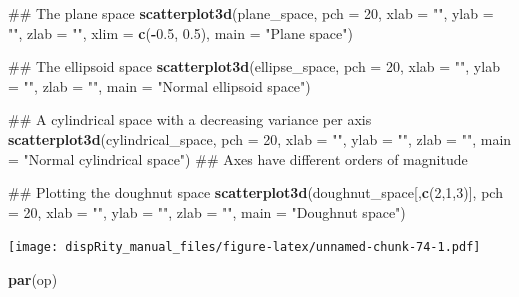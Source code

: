 \documentclass[]{book}
\newenvironment{Shaded}{\begin{snugshade}}{\end{snugshade}}
\newcommand{\KeywordTok}[1]{\textcolor[rgb]{0.13,0.29,0.53}{\textbf{#1}}}
\newcommand{\DataTypeTok}[1]{\textcolor[rgb]{0.13,0.29,0.53}{#1}}
\newcommand{\DecValTok}[1]{\textcolor[rgb]{0.00,0.00,0.81}{#1}}
\newcommand{\FloatTok}[1]{\textcolor[rgb]{0.00,0.00,0.81}{#1}}
\newcommand{\StringTok}[1]{\textcolor[rgb]{0.31,0.60,0.02}{#1}}
\newcommand{\OperatorTok}[1]{\textcolor[rgb]{0.81,0.36,0.00}{\textbf{#1}}}
\newcommand{\NormalTok}[1]{#1}
\theoremstyle{definition}
\theoremstyle{definition}
\theoremstyle{remark}
\begin{document}
\begin{Shaded}
\begin{Highlighting}[]
\NormalTok{## The plane space}
\KeywordTok{scatterplot3d}\NormalTok{(plane_space, }\DataTypeTok{pch =} \DecValTok{20}\NormalTok{, }\DataTypeTok{xlab =} \StringTok{""}\NormalTok{, }\DataTypeTok{ylab =} \StringTok{""}\NormalTok{, }\DataTypeTok{zlab =} \StringTok{""}\NormalTok{,}
              \DataTypeTok{xlim =} \KeywordTok{c}\NormalTok{(}\OperatorTok{-}\FloatTok{0.5}\NormalTok{, }\FloatTok{0.5}\NormalTok{), }\DataTypeTok{main =} \StringTok{"Plane space"}\NormalTok{)}

\NormalTok{## The ellipsoid space}
\KeywordTok{scatterplot3d}\NormalTok{(ellipse_space, }\DataTypeTok{pch =} \DecValTok{20}\NormalTok{, }\DataTypeTok{xlab =} \StringTok{""}\NormalTok{, }\DataTypeTok{ylab =} \StringTok{""}\NormalTok{, }\DataTypeTok{zlab =} \StringTok{""}\NormalTok{,}
              \DataTypeTok{main =} \StringTok{"Normal ellipsoid space"}\NormalTok{)}

\NormalTok{## A cylindrical space with a decreasing variance per axis}
\KeywordTok{scatterplot3d}\NormalTok{(cylindrical_space, }\DataTypeTok{pch =} \DecValTok{20}\NormalTok{, }\DataTypeTok{xlab =} \StringTok{""}\NormalTok{, }\DataTypeTok{ylab =} \StringTok{""}\NormalTok{, }\DataTypeTok{zlab =} \StringTok{""}\NormalTok{,}
              \DataTypeTok{main =} \StringTok{"Normal cylindrical space"}\NormalTok{)}
\NormalTok{## Axes have different orders of magnitude}

\NormalTok{## Plotting the doughnut space}
\KeywordTok{scatterplot3d}\NormalTok{(doughnut_space[,}\KeywordTok{c}\NormalTok{(}\DecValTok{2}\NormalTok{,}\DecValTok{1}\NormalTok{,}\DecValTok{3}\NormalTok{)], }\DataTypeTok{pch =} \DecValTok{20}\NormalTok{, }\DataTypeTok{xlab =} \StringTok{""}\NormalTok{, }\DataTypeTok{ylab =} \StringTok{""}\NormalTok{,}
              \DataTypeTok{zlab =} \StringTok{""}\NormalTok{, }\DataTypeTok{main =} \StringTok{"Doughnut space"}\NormalTok{)}
\end{Highlighting}
\end{Shaded}

\texttt{[image: dispRity\_manual\_files/figure-latex/unnamed-chunk-74-1.pdf]}

\begin{Shaded}
\begin{Highlighting}[]
\KeywordTok{par}\NormalTok{(op)}
\end{Highlighting}
\end{Shaded}
\end{document}
